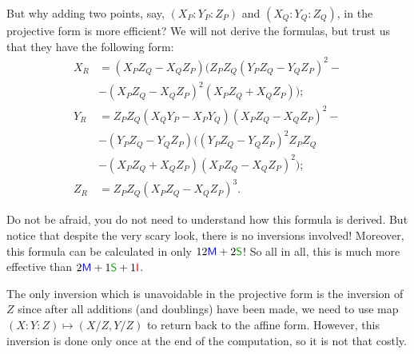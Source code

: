 \documentclass[../lecture-notes.tex]{subfiles}
\begin{document}
But why adding two points, say, $(X_P:Y_P:Z_P)$ and $(X_Q:Y_Q:Z_Q)$, in the projective form is more efficient? We will not derive the formulas, but trust us that they have the following form:
\begin{equation*}
    \begin{aligned}
        X_R &= (X_PZ_Q - X_QZ_P)(Z_PZ_Q(Y_PZ_Q-Y_QZ_P)^2 - \\
            &- (X_PZ_Q-X_QZ_P)^2(X_PZ_Q+X_QZ_P)); \\
        Y_R &= Z_PZ_Q(X_QY_P - X_PY_Q)(X_PZ_Q-X_QZ_P)^2 - \\
            &- (Y_PZ_Q-Y_QZ_P)((Y_PZ_Q-Y_QZ_P)^2Z_PZ_Q \\
            &-(X_PZ_Q+X_QZ_P)(X_PZ_Q-X_QZ_P)^2); \\
        Z_R &= Z_PZ_Q(X_PZ_Q - X_QZ_P)^3.
    \end{aligned}
\end{equation*}

\vspace{-1mm}

Do not be afraid, you do not need to understand how this formula is derived. But notice that despite the very scary look, there is no inversions involved! Moreover, this formula can be calculated in only $12\textcolor{blue}{\mathsf{M}}+2\textcolor{green!60!black}{\mathsf{S}}$! So all in all, this is much more effective than $2\textcolor{blue}{\mathsf{M}} + 1\textcolor{green!60!black}{\mathsf{S}} + 1\textcolor{red}{\mathsf{I}}$.

The only inversion which is unavoidable in the projective form is the inversion of $Z$ since after all additions (and doublings) have been made, we need to use map $(X:Y:Z) \mapsto (X/Z,Y/Z)$ to return back to the affine form. However, this inversion is done only once at the end of the computation, so it is not that costly.

\vspace{-1mm}
\end{document}
